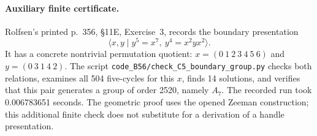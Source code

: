 \paragraph{Auxiliary finite certificate.}
Rolfsen's printed p.~356, \S11E, Exercise~3, records the boundary presentation\cite{C5HRolfsen1976}
\[
 \langle x,y\mid y^5=x^7,\ y^4=x^2yx^2\rangle.
\]
It has a concrete nontrivial permutation quotient:
$x=(0\ 1\ 2\ 3\ 4\ 5\ 6)$ and $y=(0\ 3\ 1\ 4\ 2)$.
The script \texttt{code\_B56/check\_C5\_boundary\_group.py} checks both
relations, examines all 504 five-cycles for this $x$, finds 14 solutions,
and verifies that this pair generates a group of order 2520, namely $A_7$.
The recorded run took 0.006783651 seconds.  The geometric proof uses the
opened Zeeman construction; this additional finite check does not substitute
for a derivation of a handle presentation.
